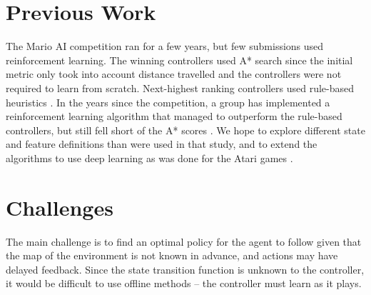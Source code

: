 \documentclass[12pt]{article}
\begin{document}
\section{Previous Work}

The Mario AI competition ran for a few years, but few submissions used reinforcement learning. The winning controllers used A* search since the initial metric only took into account distance travelled and the controllers were not required to learn from scratch. Next-highest ranking controllers used rule-based heuristics \cite{karakovskiy}. In the years since the competition, a group has implemented a reinforcement learning algorithm that managed to outperform the rule-based controllers, but still fell short of the A* scores \cite{tsay}. We hope to explore different state and feature definitions than were used in that study, and to extend the algorithms to use deep learning as was done for the Atari games \cite{mnih}.



\section{Challenges}

The main challenge is to find an optimal policy for the agent to follow given that the map of the environment is not known in advance, and actions may have delayed feedback. Since the state transition function is unknown to the controller, it would be difficult to use offline methods -- the controller must learn as it plays. 
\end{document}
